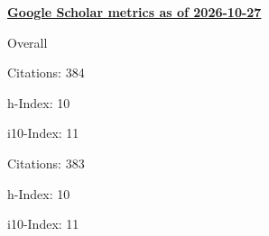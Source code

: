 \textbf{\href{https://scholar.google.it/citations?user=iJDPEaUAAAAJ&hl=it&oi=ao}{Google Scholar metrics as of 2026-10-27}}
\medskip
\centering
\begin{minipage}{.4\textwidth}
    \begin{outerlist}
        \item[] Overall
        \begin{innerlist}
            \item Citations: 384
            \item h-Index: 10
            \item i10-Index: 11
        \end{innerlist}
    \end{outerlist}
\end{minipage}
\hfill
\begin{minipage}{.4\textwidth}
    \begin{outerlist}
        \item[]
        \begin{innerlist}
            \item Citations: 383
            \item h-Index: 10
            \item i10-Index: 11
        \end{innerlist}
    \end{outerlist}
\end{minipage}
\vspace{1em}
